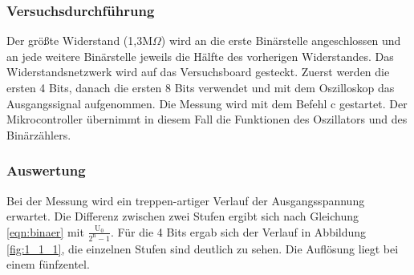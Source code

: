 \documentclass[12pt,a4paper]{article}
\begin{document}
\subsubsection*{Versuchsdurchführung}

Der größte Widerstand (1,3M$\Omega$) wird an die erste Binärstelle angeschlossen und an jede weitere Binärstelle jeweils die Hälfte des vorherigen Widerstandes. Das Widerstandsnetzwerk wird auf das Versuchsboard gesteckt. Zuerst werden die ersten 4 Bits, danach die ersten 8 Bits verwendet und mit dem Oszilloskop das Ausgangssignal aufgenommen. Die Messung wird mit dem Befehl c gestartet. Der Mikrocontroller übernimmt in diesem Fall die Funktionen des Oszillators und des Binärzählers.

\subsubsection*{Auswertung}

Bei der Messung wird ein treppen-artiger Verlauf der Ausgangsspannung erwartet. Die Differenz zwischen zwei Stufen ergibt sich nach Gleichung \ref{eqn:binaer} mit $\frac{\text{U}_0}{2^\text{n}-1}$. Für die 4 Bits ergab sich der Verlauf in Abbildung \ref{fig:1_1_1}, die einzelnen Stufen sind deutlich zu sehen. Die Auflösung liegt bei einem fünfzentel.
\end{document}
